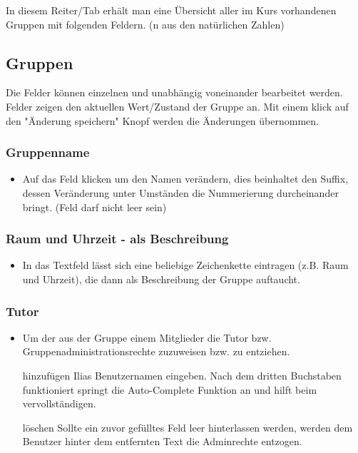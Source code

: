 In diesem Reiter/Tab erhält man eine Übersicht aller im Kurs vorhandenen Gruppen mit folgenden Feldern. (n aus den natürlichen Zahlen)
\subsection*{Gruppen}
Die Felder können einzelnen und unabhängig voneinander bearbeitet werden. Felder zeigen den aktuellen Wert/Zustand der Gruppe an. 
Mit einem klick auf den "Änderung speichern" Knopf werden die Änderungen übernommen. 

\subsubsection{Gruppenname}
\begin{itemize}
	\item Auf das Feld klicken um den Namen verändern, dies beinhaltet den Suffix, dessen Veränderung unter Umständen die Nummerierung durcheinander bringt. (Feld darf nicht leer sein)
\end{itemize}

\subsubsection{Raum und Uhrzeit - als Beschreibung}
\begin{itemize}
	\item In das Textfeld lässt sich eine beliebige Zeichenkette eintragen (z.B. Raum und Uhrzeit), die dann als Beschreibung der Gruppe auftaucht. 
\end{itemize}

\subsubsection{Tutor}
\begin{itemize}
	\item Um der aus der Gruppe einem Mitglieder die Tutor bzw. Gruppenadministrationsrechte zuzuweisen bzw. zu entziehen. 
	\item[hinzufügen] Ilias Benutzernamen eingeben. Nach dem dritten Buchstaben funktioniert springt die Auto-Complete Funktion an und hilft beim vervollständigen. 
	\item[löschen] Sollte ein zuvor gefülltes Feld leer hinterlassen werden, werden dem Benutzer hinter dem entfernten Text die Adminrechte entzogen.
\end{itemize}

